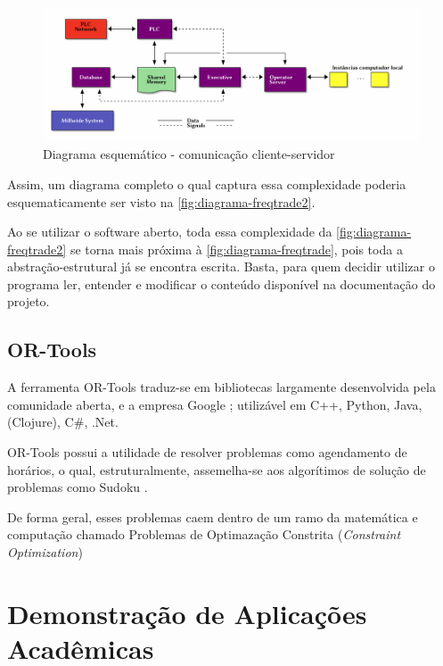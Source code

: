 \documentclass[
12pt,				%
openright,			%
oneside,			%
a4paper,			%
english,			%
french,				%
spanish,			%
brazil,				%
]{abntex2}
\begin{document}
\begin{figure}[ht]
  \centering
  \caption{\label{fig:diagrama-freqtrade2} Diagrama esquemático -
    comunicação cliente-servidor}
  \includegraphics[width=1\linewidth]{ditaa_4.png}
\end{figure}

Assim, um diagrama completo o qual captura essa complexidade poderia
esquematicamente ser visto na \autoref{fig:diagrama-freqtrade2}.

Ao se utilizar o software aberto, toda essa complexidade da
\autoref{fig:diagrama-freqtrade2} se torna mais próxima à
\autoref{fig:diagrama-freqtrade}, pois toda a abstração-estrutural já
se encontra escrita. Basta, para quem decidir utilizar o programa ler,
entender e modificar o conteúdo disponível na documentação do projeto.



\subsection{OR-Tools}
\label{sec:ortools}

A ferramenta OR-Tools traduz-se em bibliotecas largamente desenvolvida
pela comunidade aberta, e a empresa Google \cite{}; utilizável em C++,
Python, Java, (Clojure), C\#, .Net.

OR-Tools possui a utilidade de resolver problemas como agendamento de
horários, o qual, estruturalmente, assemelha-se aos algorítimos de
solução de problemas como Sudoku \cite{}.

De forma geral, esses problemas caem dentro de um ramo da matemática e
computação chamado Problemas de Optimazação Constrita
(\textit{Constraint Optimization})

\section{Demonstração de Aplicações Acadêmicas}
\end{document}
